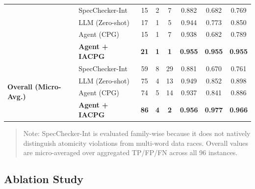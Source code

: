 \documentclass[conference]{IEEEtran}
\begin{document}
\begin{table}[H]
{\begin{tabular}{llcccccc}
\addlinespace[0.5em]
\multirow{4}{*}{MSP430} & SpecChecker-Int & 15 & 2 & 7 & 0.882 & 0.682 & 0.769 \\
                        & LLM (Zero-shot) & 17 & 1 & 5 & 0.944 & 0.773 & 0.850 \\
                        & Agent (CPG)     & 15 & 1 & 7 & 0.938 & 0.682 & 0.789 \\
                        & \textbf{Agent + IACPG} & \textbf{21} & \textbf{1} & \textbf{1} & \textbf{0.955} & \textbf{0.955} & \textbf{0.955} \\
\midrule
\midrule
\multirow{4}{*}{\textbf{Overall (Micro-Avg.)}} & SpecChecker-Int & 59 & 8  & 29 & 0.881 & 0.670 & 0.761 \\
                                               & LLM (Zero-shot) & 75 & 4  & 13 & 0.949 & 0.852 & 0.898 \\
                                               & Agent (CPG)     & 74 & 5  & 14 & 0.937 & 0.841 & 0.886 \\
                                               & \textbf{Agent + IACPG} & \textbf{86} & \textbf{4} & \textbf{2} & \textbf{0.956} & \textbf{0.977} & \textbf{0.966} \\
\bottomrule
\end{tabular}
}
  \begin{quote}
    {\footnotesize Note: SpecChecker-Int is evaluated family-wise because it does not natively distinguish atomicity violations from multi-word data races. Overall values are micro-averaged over aggregated TP/FP/FN across all 96 instances.}
  \end{quote}
\end{table}


\subsection{Ablation Study}
\end{document}
